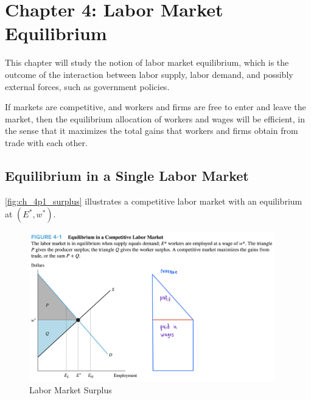 \section{Chapter 4: Labor Market Equilibrium}

This chapter will study the notion of labor market equilibrium,
which is the outcome of the interaction between labor supply, labor demand,
and possibly external forces, such as government policies.


\begin{definition} 
    
    If markets are competitive, and workers and 
    firms are free to enter and leave the market, then 
    the equilibrium allocation of workers and wages 
    will be efficient, in the sense that it maximizes 
    the total gains that workers and firms 
    obtain from trade with each other.

\end{definition}

\subsection{Equilibrium in a Single Labor Market}

\autoref{fig:ch_4p1_surplus}
illustrates a competitive labor market with an 
equilibrium at $(E^*, w^*)$.


\FloatBarrier

\begin{figure}[!htb]
    \centering
        \includegraphics[width=0.95\textwidth]{../input/ch_4p1_surplus.png}
    \caption{Labor Market Surplus}
    \label{fig:ch_4p1_surplus}
\end{figure}

